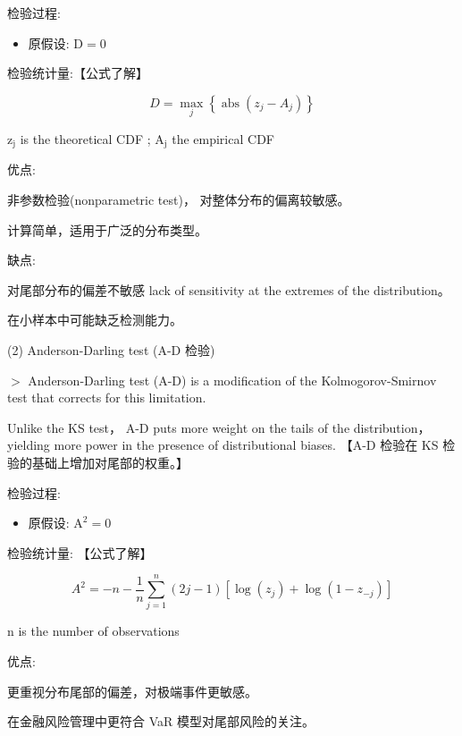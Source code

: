      检验过程:
    
    \begin{itemize}
    \item 原假设: \(\mathrm{D} = 0\)
    \end{itemize}
    
    检验统计量:【公式了解】
    
    \[
    D = \mathop{\max }\limits_{j}\left\{  {\operatorname{abs}\left( {{z}_{j} - {A}_{j}}\right) }\right\}
    \]
    
    \({\mathrm{z}}_{\mathrm{j}}\) is the theoretical CDF ; \({\mathrm{A}}_{\mathrm{j}}\) the empirical CDF
    
    优点:
    
    非参数检验(nonparametric test)， 对整体分布的偏离较敏感。
    
    计算简单，适用于广泛的分布类型。
    
     缺点:
    
    对尾部分布的偏差不敏感 lack of sensitivity at the extremes of the distribution。
    
    在小样本中可能缺乏检测能力。
    
    (2) Anderson-Darling test (A-D 检验)
    
    \(>\) Anderson-Darling test (A-D) is a modification of the Kolmogorov-Smirnov test that corrects for this limitation.
    
     Unlike the KS test， A-D puts more weight on the tails of the distribution， yielding more power in the presence of distributional biases. 【A-D 检验在 KS 检验的基础上增加对尾部的权重。】
    
     检验过程:
    
    \begin{itemize}
    \item 原假设: \({\mathrm{A}}^{2} = 0\)
    \end{itemize}
    
    检验统计量: 【公式了解】
    
    \[
    {A}^{2} =  - n - \frac{1}{n}\mathop{\sum }\limits_{{j = 1}}^{n}\left( {{2j} - 1}\right) \left\lbrack  {\log \left( {z}_{j}\right)  + \log \left( {1 - {z}_{-j}}\right) }\right\rbrack
    \]
    
    \(\mathrm{n}\) is the number of observations
    
     优点:
    
    更重视分布尾部的偏差，对极端事件更敏感。
    
    在金融风险管理中更符合 VaR 模型对尾部风险的关注。
    
